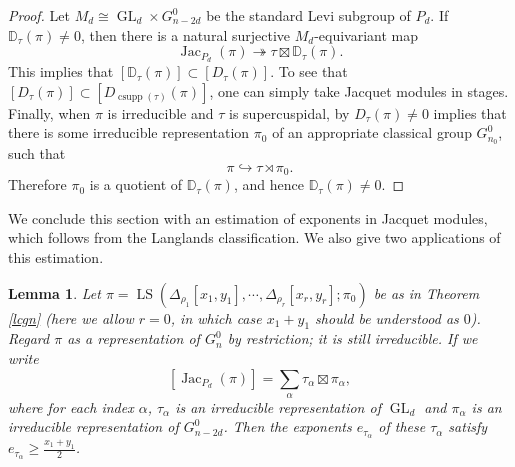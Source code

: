 \documentclass[11pt,letterpaper]{amsart}
\theoremstyle{plain}
\newcounter{theorem}[section]
\numberwithin{theorem}{section}
\numberwithin{equation}{subsection}
\newtheorem{Lem}[theorem]{Lemma}
\theoremstyle{remark}
\newcommand{\GL}{\operatorname{GL}}
\newcommand{\Jac}{\operatorname{Jac}}
\newcommand{\csupp}{\operatorname{csupp}} %
\newcommand{\LS}{\operatorname{LS}} %
\newcommand{\D}{\mathbb{D}}
\begin{document}
\vskip 5pt

\begin{proof}
Let $M_d\cong \GL_d\times G^0_{n-2d}$ be the standard Levi subgroup of $P_d$. If $\D_\tau(\pi)\neq 0$, then there is a natural surjective $M_d$-equivariant map
\[
    \Jac_{P_d}(\pi) \twoheadrightarrow \tau\boxtimes \D_\tau(\pi).
\]
This implies that $\left[\D_\tau(\pi)\right] \subset \left[D_\tau(\pi)\right]$. To see that $\left[D_\tau(\pi)\right] \subset \left[D_{\csupp(\tau)}(\pi)\right]$, one can simply take Jacquet modules in stages. Finally, when $\pi$ is irreducible and $\tau$ is supercuspidal, by \cite[Lem. 5.3]{MR3713922} $D_\tau(\pi)\neq 0$ implies that there is some irreducible representation $\pi_0$ of an appropriate classical group $G^0_{n_0}$, such that
\[
    \pi \hookrightarrow \tau \rtimes \pi_0.
\]
Therefore $\pi_0$ is a quotient of $\D_\tau(\pi)$, and hence $\D_\tau(\pi)\neq 0$.

\end{proof}

\vskip 5pt

We conclude this section with an estimation of exponents in Jacquet modules, which follows from the Langlands classification. We also give two applications of this estimation.

\begin{Lem}\label{L:ExpInJacModLowerBound}
Let $\pi=\LS\left(\Delta_{\rho_1}[x_1,y_1],\cdots,\Delta_{\rho_r}[x_r,y_r];\pi_0\right)$ be as in Theorem \ref{lcgn} (here we allow $r=0$, in which case $x_1+y_1$ should be understood as $0$). Regard $\pi$ as a representation of $G^0_n$ by restriction; it is still irreducible. If we write
\[
    \left[\Jac_{P_d}(\pi)\right] = \sum_\alpha \tau_\alpha\boxtimes\pi_\alpha,
\]
where for each index $\alpha$, $\tau_\alpha$ is an irreducible representation of $\GL_{d}$ and $\pi_\alpha$ is an irreducible representation of $G^0_{n-2d}$. Then the exponents $e_{\tau_\alpha}$ of these $\tau_\alpha$ satisfy $e_{\tau_\alpha}\geq \frac{x_1+y_1}{2}$. 
\end{Lem}

\vskip 5pt
\end{document}
